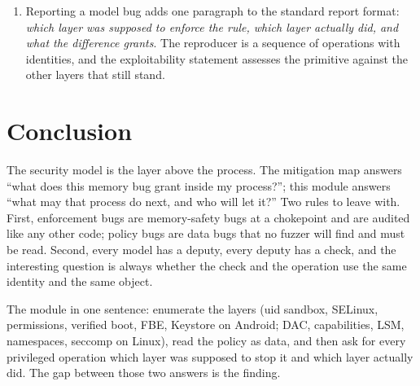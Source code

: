 \documentclass[12pt]{Training}
\begin{document}
\begin{enumerate}
\begin{enumerate}
        \item Policy bugs: shipped permissive domains, \lstinline{signatureOrSystem} permissions, world-writable device nodes, and vendor \lstinline{allow} rules added for a single app. These are found by reading policy as data, not by fuzzing.
        \item Seam bugs: the confused deputy family (a service acting on a caller-supplied path), an fd-passing grant that outlives the check, and an Android \lstinline{checkCallingOrSelfPermission} misuse. These are found by enumerating the interfaces between layers.
    \end{enumerate}
    \item Reporting a model bug adds one paragraph to the standard report format: \emph{which layer was supposed to enforce the rule, which layer actually did, and what the difference grants}. The reproducer is a sequence of operations with identities, and the exploitability statement assesses the primitive against the other layers that still stand.
\end{enumerate}

\section*{Conclusion}
The security model is the layer above the process. The mitigation map answers ``what does this memory bug grant inside my process?''; this module answers ``what may that process do next, and who will let it?'' Two rules to leave with. First, enforcement bugs are memory-safety bugs at a chokepoint and are audited like any other code; policy bugs are data bugs that no fuzzer will find and must be read. Second, every model has a deputy, every deputy has a check, and the interesting question is always whether the check and the operation use the same identity and the same object.

The module in one sentence: enumerate the layers (uid sandbox, SELinux, permissions, verified boot, FBE, Keystore on Android; DAC, capabilities, LSM, namespaces, seccomp on Linux), read the policy as data, and then ask for every privileged operation which layer was supposed to stop it and which layer actually did. The gap between those two answers is the finding.
\end{document}
